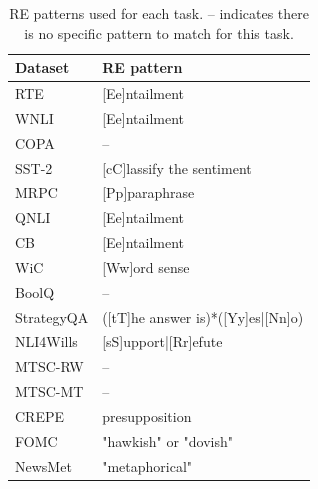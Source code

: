 \documentclass[letterpaper]{article} %
\begin{document}
\begin{table}[t!]
\centering \small
\begin{tabular}{l||l}
Dataset & RE pattern  \\ \hline \hline
RTE  &  [Ee]ntailment \\
WNLI &  [Ee]ntailment \\
COPA &  -- \\
SST-2 &  [cC]lassify the sentiment\\
MRPC &  [Pp]paraphrase \\
QNLI &  [Ee]ntailment \\
CB   &  [Ee]ntailment \\
WiC &   [Ww]ord sense \\
BoolQ & -- \\
\hline \hline
StrategyQA &  ([tT]he answer is)*([Yy]es|[Nn]o) \\
NLI4Wills &  [sS]upport|[Rr]efute\\
MTSC-RW & --\\
MTSC-MT & --\\
CREPE & presupposition \\
FOMC & "hawkish" or "dovish"\\
NewsMet & "metaphorical" \\
\end{tabular}
\caption[]{RE patterns used for each task. -- indicates there is no specific pattern to match for this task.}
\label{tab-re-patterns}
\end{table}



\end{document}
